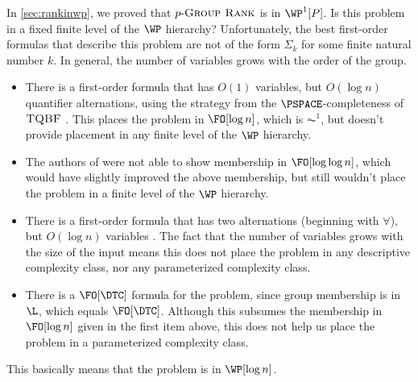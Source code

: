 \documentclass{article}
\newcommand{\dash}{\textnormal{-}}
\newcommand{\pgrouprank}{p\dash\textsc{Group Rank}}
\begin{document}
In \autoref{sec:rankinwp}, we proved that $\pgrouprank$ is in $\WP^1[P]$.
Is this problem in a fixed finite level of the $\WP$ hierarchy?
Unfortunately, the best first-order formulas that describe this problem are not of the form $\Sigma_k$ for some finite natural number $k$.
In general, the number of variables grows with the order of the group.
\begin{itemize}
\item
  There is a first-order formula that has $O(1)$ variables, but $O(\log n)$ quantifier alternations, using the strategy from the $\PSPACE$-completeness of $\textsc{TQBF}$ \autocite[Lemma~2.3]{nt16}.
  This places the problem in $\FO[\log n]$, which is $\AC^1$, but doesn't provide placement in any finite level of the $\WP$ hierarchy.
\item
  The authors of \autocite{bklm01} were not able to show membership in $\FO[\log \log n]$, which would have slightly improved the above membership, but still wouldn't place the problem in a finite level of the $\WP$ hierarchy.
\item
  There is a first-order formula that has two alternations (beginning with $\forall$), but $O(\log n)$ variables \autocite[Lemma~3.5]{nt16}.
  The fact that the number of variables grows with the size of the input means this does not place the problem in any descriptive complexity class, nor any parameterized complexity class.
\item
  There is a $\FO[\DTC]$ formula for the problem, since group membership is in $\L$, which equals $\FO[\DTC]$.
  Although this subsumes the membership in $\FO[\log n]$ given in the first item above, this does not help us place the problem in a parameterized complexity class.
\end{itemize}
This basically means that the problem is in $\WP[\log n]$.
\end{document}
